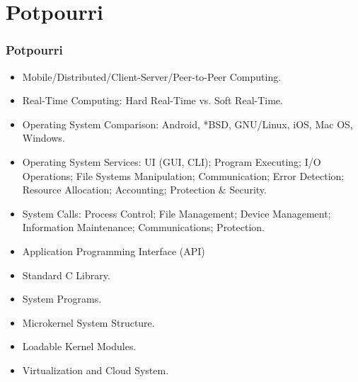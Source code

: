 \documentclass[xcolor=table, notheorems, hyperref={pdfpagelabels=false}]{beamer}
\begin{document}
\section{Potpourri}
\begin{frame}
\frametitle{Potpourri}
\begin{itemize}
\item Mobile/Distributed/Client-Server/Peer-to-Peer Computing.
\item Real-Time Computing: Hard Real-Time vs. Soft Real-Time.
\item Operating System Comparison: 
Android, 
*BSD,
GNU/Linux, 
iOS, 
Mac OS, 
Windows.
\item Operating System Services: UI (GUI, CLI); Program Executing; I/O Operations; 
      File Systems Manipulation; Communication; Error Detection; Resource Allocation;
      Accounting; Protection \& Security.
\item System Calls: Process Control; File Management; Device Management; Information
      Maintenance; Communications; Protection.
\item Application Programming Interface (API)
\item Standard C Library.
\item System Programs.
\item Microkernel System Structure.
\item Loadable Kernel Modules.
\item Virtualization and Cloud System.
\end{itemize}
\end{frame}

\end{document}
